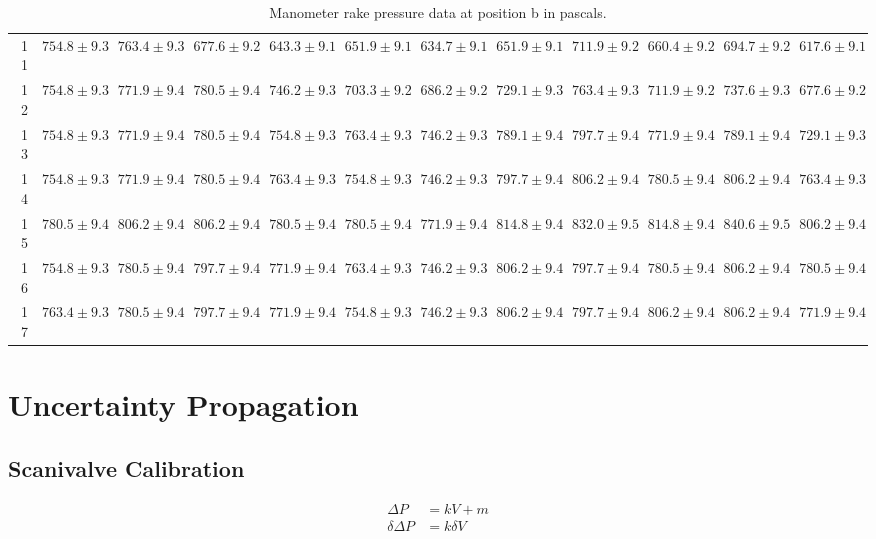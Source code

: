 \documentclass[runningheads]{llncs}
\begin{document}
\begin{table}
\begin{center}
\begin{tabular}{rrrrrrrrrrrr}
11 &  $754.8\pm9.3$ &  $763.4\pm9.3$ &  $677.6\pm9.2$ &  $643.3\pm9.1$ &  $651.9\pm9.1$ &  $634.7\pm9.1$ &  $651.9\pm9.1$ &  $711.9\pm9.2$ &  $660.4\pm9.2$ &  $694.7\pm9.2$ &  $617.6\pm9.1$ \\
12 &  $754.8\pm9.3$ &  $771.9\pm9.4$ &  $780.5\pm9.4$ &  $746.2\pm9.3$ &  $703.3\pm9.2$ &  $686.2\pm9.2$ &  $729.1\pm9.3$ &  $763.4\pm9.3$ &  $711.9\pm9.2$ &  $737.6\pm9.3$ &  $677.6\pm9.2$ \\
13 &  $754.8\pm9.3$ &  $771.9\pm9.4$ &  $780.5\pm9.4$ &  $754.8\pm9.3$ &  $763.4\pm9.3$ &  $746.2\pm9.3$ &  $789.1\pm9.4$ &  $797.7\pm9.4$ &  $771.9\pm9.4$ &  $789.1\pm9.4$ &  $729.1\pm9.3$ \\
14 &  $754.8\pm9.3$ &  $771.9\pm9.4$ &  $780.5\pm9.4$ &  $763.4\pm9.3$ &  $754.8\pm9.3$ &  $746.2\pm9.3$ &  $797.7\pm9.4$ &  $806.2\pm9.4$ &  $780.5\pm9.4$ &  $806.2\pm9.4$ &  $763.4\pm9.3$ \\
15 &  $780.5\pm9.4$ &  $806.2\pm9.4$ &  $806.2\pm9.4$ &  $780.5\pm9.4$ &  $780.5\pm9.4$ &  $771.9\pm9.4$ &  $814.8\pm9.4$ &  $832.0\pm9.5$ &  $814.8\pm9.4$ &  $840.6\pm9.5$ &  $806.2\pm9.4$ \\
16 &  $754.8\pm9.3$ &  $780.5\pm9.4$ &  $797.7\pm9.4$ &  $771.9\pm9.4$ &  $763.4\pm9.3$ &  $746.2\pm9.3$ &  $806.2\pm9.4$ &  $797.7\pm9.4$ &  $780.5\pm9.4$ &  $806.2\pm9.4$ &  $780.5\pm9.4$ \\
17 &  $763.4\pm9.3$ &  $780.5\pm9.4$ &  $797.7\pm9.4$ &  $771.9\pm9.4$ &  $754.8\pm9.3$ &  $746.2\pm9.3$ &  $806.2\pm9.4$ &  $797.7\pm9.4$ &  $806.2\pm9.4$ &  $806.2\pm9.4$ &  $771.9\pm9.4$ \\
\bottomrule
\end{tabular}
\end{center}
\caption{Manometer rake pressure data at position b in pascals.}
\label{tab:pressure_manometer_rake_b}
\end{table}
\newpage
\section{Uncertainty Propagation}

\subsection{Scanivalve Calibration}

\begin{align*}
    \Delta P &= kV + m \\
    \delta \Delta P &= k\delta V\\
\end{align*}
\end{document}
